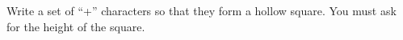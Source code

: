 \question[0]  Write a set of ``+'' characters so that they form a hollow square. You must ask for the height of the square. 
